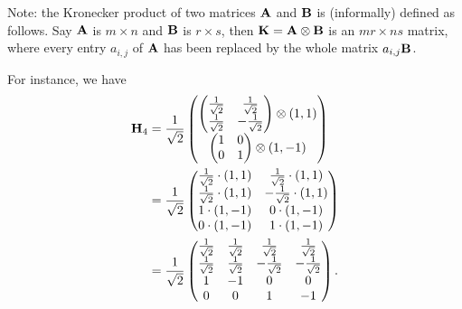 \documentclass[a4paper, 11pt, openany]{book}
\begin{document}
Note: the Kronecker product of two matrices ${\bf A}$ and ${\bf B}$ is (informally) defined as follows. Say ${\bf A}$ is $m \times n$ and ${\bf B}$ is $r \times s$, then ${\bf K} = {\bf A} \otimes {\bf B}$ is an $mr \times ns$ matrix, where every entry $a_{i,j}$ of ${\bf A}$ has been replaced by the whole matrix $a_{i,j}{\bf B}$.

For instance, we have
\begin{align*}
    {\bf H}_4 &= \frac{1}{\sqrt{2}} \begin{pmatrix}
     \begin{pmatrix}
    \frac{1}{\sqrt{2}} & \frac{1}{\sqrt{2}}\\
    \frac{1}{\sqrt{2}} & -\frac{1}{\sqrt{2}}
    \end{pmatrix} \otimes (1,1)\\
    \begin{pmatrix}
    1 & 0\\
    0 & 1
    \end{pmatrix} \otimes (1, -1)
    \end{pmatrix}\\
    &= \frac{1}{\sqrt{2}} \begin{pmatrix}
    \frac{1}{\sqrt{2}} \cdot (1,1) & \frac{1}{\sqrt{2}} \cdot (1,1)\\
    \frac{1}{\sqrt{2}} \cdot (1,1) & -\frac{1}{\sqrt{2}} \cdot (1,1)\\
    1 \cdot (1, -1) & 0 \cdot (1, -1)\\
    0 \cdot (1, -1) & 1 \cdot (1, -1)
    \end{pmatrix}\\
    &= \frac{1}{ \sqrt{2} } \begin{pmatrix}
    \frac{1}{\sqrt{2}}           & \frac{1}{\sqrt{2}}         & \frac{1}{\sqrt{2}}         & \frac{1}{\sqrt{2}}\\
    \frac{1}{\sqrt{2}}           & \frac{1}{\sqrt{2}}         & -\frac{1}{\sqrt{2}}        & -\frac{1}{\sqrt{2}}\\
    1    & -1 & 0         & 0\\
    0           & 0         & 1  & -1
    \end{pmatrix}.
\end{align*}
\end{document}
